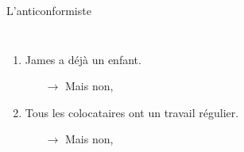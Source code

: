 \begin{frame}{L'anticonformiste}
\begin{columns}[t]
\begin{enumerate}
\begin{itemize}
        \end{itemize}
        \item James a \alert{déjà} un enfant.
        \begin{itemize}
          \scriptsize
          \item[$\to$] Mais non, 
        \end{itemize}
        \item \alert{Tous les colocataires} ont un travail régulier.
        \begin{itemize}
          \scriptsize
          \item[$\to$] Mais non, 
        \end{itemize}
      \end{enumerate}
  \end{columns}
\end{frame}